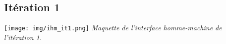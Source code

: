 \documentclass[hidelinks, 10pt,a4paper]{article}
\begin{document}
\begin{comment}
\begin{center}
\begin{ganttchart}{1}{14}
  \gantttitle{Numéros de semaines}{14} \\
  \gantttitlelist{5,...,18}{1} \\
  \ganttgroup{Itération 1}{1}{5} \\
  \ganttgroup{Itération 2}{6}{10} \\
  \ganttgroup{Itération 3}{11}{14} \ganttnewline[thick]
  \ganttbar{Phases de test}{5}{5}\ganttbar{}{10}{10}\ganttbar{}{14}{14} \\
  \ganttbar{Préparation du sprint}{6}{6}\ganttbar{}{11}{11} \\
  \ganttmilestone{Livrable 1}{5} \\
  \ganttmilestone{Livrable 2}{10} \\
  \ganttmilestone{Application finale}{14} \ganttnewline[thick]
  \ganttbar{Entrée / Sortie}{1}{3} \\
  \ganttbar{Modèle des diagrammes}{1}{3} \\
  \ganttbar{IHM diagramme de classes}{1}{3} \\
  \ganttbar{Déplacement des entités}{2}{3} \\
  \ganttbar{Gestion des relations}{2}{3} \ganttnewline[thick]
  \ganttbar{Finalisation de la partie centrale de l'IHM}{7}{7} \\
  \ganttbar{Partie gauche de l'IHM}{7}{9} \\
  \ganttbar{Partie droite de l'IHM}{7}{9} \\
  \ganttbar{Fonctionnalités du menu de l'application}{8}{9} \ganttnewline[thick]
  \ganttbar{IHM diagramme de cas d'utilisation}{11}{12} \\
  \ganttbar{Corrections sur l'IHM}{11}{12} \\
  \ganttbar{Finalisation du projet}{13}{14}
\end{ganttchart}
\end{center}
\end{comment}


\subsection{Itération 1}
\begin{center}
  \texttt{[image: img/ihm\_it1.png]}
\textit{Maquette de l'interface homme-machine de l'itération 1.}
\end{center}
\end{document}
